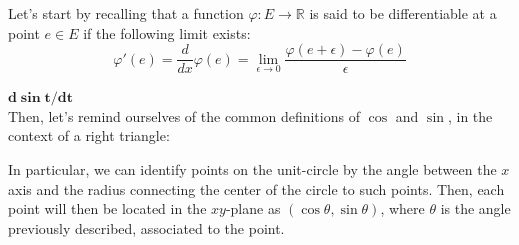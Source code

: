 \documentclass[solutions.tex]{subfiles}
\begin{document}
Let's start by recalling that a function $\varphi : E \rightarrow \mathbb{R}$
is said to be differentiable at a point $e\in E$ if the following limit exists:
\[
	\varphi'(e) = \frac{d}{dx}\varphi(e) =
		\boxed{\lim_{\epsilon \rightarrow 0}\frac{\varphi(e+\epsilon)-\varphi(e)}{\epsilon}}
\]

\hr
$\pmb{d\sin t/dt}$\,\\
Then, let's remind ourselves of the common definitions of $\cos$ and $\sin$,
in the context of a right triangle:

\begin{figure}[H]
	\centering
\end{figure}

In particular, we can identify points on the unit-circle
by the angle between the $x$ axis and the radius connecting
the center of the circle to such points. Then, each point will
then be located in the $xy$-plane as $(\cos\theta, \sin\theta)$,
where $\theta$ is the angle previously described, associated
to the point.
\end{document}
